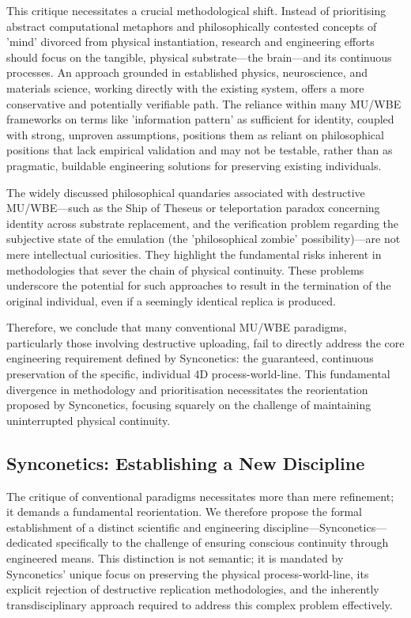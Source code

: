 \documentclass[10pt]{article}
\begin{document}
\begin{sloppypar}
  This critique necessitates a crucial methodological shift. Instead of prioritising abstract computational metaphors and philosophically contested concepts of 'mind' divorced from physical instantiation, research and engineering efforts should focus on the tangible, physical substrate—the brain—and its continuous processes. An approach grounded in established physics, neuroscience, and materials science, working directly with the existing system, offers a more conservative and potentially verifiable path. The reliance within many MU/WBE frameworks on terms like 'information pattern' as sufficient for identity, coupled with strong, unproven assumptions, positions them as reliant on philosophical positions that lack empirical validation and may not be testable, rather than as pragmatic, buildable engineering solutions for preserving existing individuals.

  The widely discussed philosophical quandaries associated with destructive MU/WBE—such as the Ship of Theseus or teleportation paradox concerning identity across substrate replacement, and the verification problem regarding the subjective state of the emulation (the 'philosophical zombie' possibility)—are not mere intellectual curiosities. They highlight the fundamental risks inherent in methodologies that sever the chain of physical continuity. These problems underscore the potential for such approaches to result in the termination of the original individual, even if a seemingly identical replica is produced.

  Therefore, we conclude that many conventional MU/WBE paradigms, particularly those involving destructive uploading, fail to directly address the core engineering requirement defined by Synconetics: the guaranteed, continuous preservation of the specific, individual 4D process-world-line. This fundamental divergence in methodology and prioritisation necessitates the reorientation proposed by Synconetics, focusing squarely on the challenge of maintaining uninterrupted physical continuity.

  \subsection{Synconetics: Establishing a New Discipline}
  \label{sec:new-discipline}

  The critique of conventional paradigms necessitates more than mere refinement; it demands a fundamental reorientation. We therefore propose the formal establishment of a distinct scientific and engineering discipline—Synconetics—dedicated specifically to the challenge of ensuring conscious continuity through engineered means. This distinction is not semantic; it is mandated by Synconetics' unique focus on preserving the physical process-world-line, its explicit rejection of destructive replication methodologies, and the inherently transdisciplinary approach required to address this complex problem effectively.


\end{sloppypar}
\end{document}
